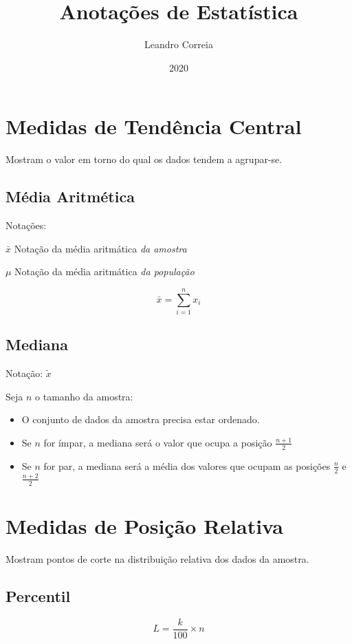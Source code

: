 \documentclass[
	12pt,
	a4paper
]{article}
\title{Anotações de Estatística}
\author{Leandro Correia}
\date{2020}
\begin{document}
\maketitle

\section{Medidas de Tendência Central}

Mostram o valor em torno do qual os dados tendem a agrupar-se.

\subsection{Média Aritmética}

Notações:

\(\bar{x}\) Notação da média aritmática \emph{da amostra}

\(\mu\) Notação da média aritmática \emph{da população}

\[\bar{x} = \sum_{i=1}^{n} x_i \] 

\subsection{Mediana}

Notação: \(\tilde{x}\)

Seja \(n\) o tamanho da amostra:
\begin{itemize}
	\item O conjunto de dados da amostra precisa estar ordenado.
	\item Se \(n\) for ímpar, a mediana será o valor que ocupa a posição \(\frac{n + 1}{2}\)
	\item Se \(n\) for par, a mediana será a média dos valores que ocupam as posições \(\frac{n}{2}\) e \(\frac{n + 2}{2}\)
\end{itemize}

\section{Medidas de Posição Relativa}

Mostram pontos de corte na distribuição relativa dos dados da amostra.

\subsection{Percentil}

\[L = \frac{k}{100} \times n\]
\end{document}
